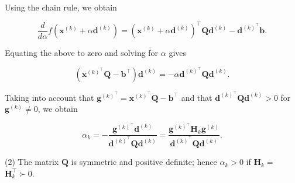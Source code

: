 Using the chain rule, we obtain

\[
	\frac{d}{d \alpha} f\left(\boldsymbol{x}^{(k)}+\alpha \boldsymbol{d}^{(k)}\right) = \left(\boldsymbol{x}^{(k)}+\alpha \boldsymbol{d}^{(k)}\right)^{\top} \boldsymbol{Q} \boldsymbol{d}^{(k)}-\boldsymbol{d}^{(k)^{\top}} \boldsymbol{b} .
\]

Equating the above to zero and solving for \(\alpha\) gives

\[
	\left(\boldsymbol{x}^{(k)^{\top}} \boldsymbol{Q}-\boldsymbol{b}^{\top}\right) \boldsymbol{d}^{(k)}=-\alpha \boldsymbol{d}^{(k)^{\top}} \boldsymbol{Q} \boldsymbol{d}^{(k)} .
\]

Taking into account that \(\boldsymbol{g}^{(k)^{\top}} = \boldsymbol{x}^{(k)^{\top}} \boldsymbol{Q}-\boldsymbol{b}^{\top}\) and that \(\boldsymbol{d}^{(k)^{\top}} \boldsymbol{Q} \boldsymbol{d}^{(k)}>0\) for \(\boldsymbol{g}^{(k)} \neq 0\), we obtain

\[
	\alpha_{k} = -\frac{\boldsymbol{g}^{(k)^{\top}} \boldsymbol{d}^{(k)}}{\boldsymbol{d}^{(k)^{\top}} \boldsymbol{Q} \boldsymbol{d}^{(k)}} = \frac{\boldsymbol{g}^{(k)^{\top}} \boldsymbol{H}_{k} \boldsymbol{g}^{(k)}}{\boldsymbol{d}^{(k)^{\top}} \boldsymbol{Q} \boldsymbol{d}^{(k)}} .
\]

(2) The matrix \(\boldsymbol{Q}\) is symmetric and positive definite; hence \(\alpha_{k}>0\) if \(\boldsymbol{H}_{k}=\) \(\boldsymbol{H}_{k}^{\top} \succ 0\).
